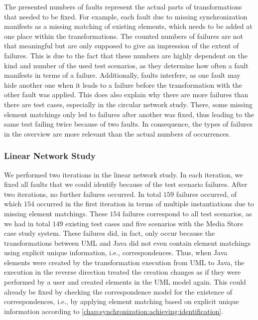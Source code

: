 The presented numbers of faults represent the actual parts of transformations that needed to be fixed.
For example, each fault due to missing synchronization manifests as a missing matching of existing elements, which needs to be added at one place within the transformations.
The counted numbers of failures are not that meaningful but are only supposed to give an impression of the extent of failures.
This is due to the fact that these numbers are highly dependent on the kind and number of the used test scenarios, as they determine how often a fault manifests in terms of a failure.
Additionally, faults interfere, as one fault may hide another one when it leads to a failure before the transformation with the other fault was applied.
This does also explain why there are more failures than there are test cases, especially in the circular network study.
There, some missing element matchings only led to failures after another was fixed, thus leading to the same test failing twice because of two faults.
In consequence, the types of failures in the overview are more relevant than the actual numbers of occurrences.

\subsubsection*{Linear Network Study} 

We performed two iterations in the linear network study.
In each iteration, we fixed all faults that we could identify because of the test scenario failures.
After two iterations, no further failures occurred.
In total $159$ failures occurred, of which $154$ occurred in the first iteration in terms of multiple instantiations due to missing element matchings.
These $154$ failures correspond to all test scenarios, as we had in total $149$ existing test cases and five scenarios with the Media Store case study system.
These failures did, in fact, only occur because the transformations between \gls{UML} and Java did not even contain element matchings using explicit unique information, i.e., correspondences.
Thus, when Java elements were created by the transformation execution from \gls{UML} to Java, the execution in the reverse direction treated the creation changes as if they were performed by a user and created elements in the \gls{UML} model again.
This could already be fixed by checking the correspondence model for the existence of correspondences, i.e., by applying element matching based on explicit unique information according to \autoref{chap:synchronization:achieving:identification}.

